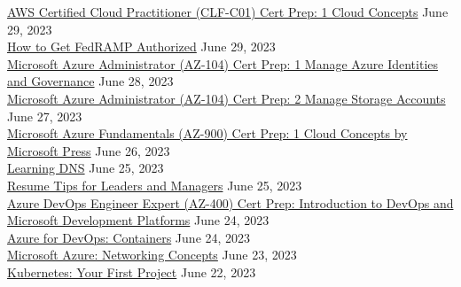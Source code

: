 \documentclass[10pt]{res} %
\begin{document}
\begin{resume}
\href{https://www.linkedin.com/learning/certificates/9de22d87bd7fea7ed83ca23598652f8403624124fe1c69571113fe7b2f4c4d00}{\color{blue}AWS Certified Cloud Practitioner (CLF-C01) Cert Prep: 1 Cloud Concepts} \hfill June 29, 2023 \\
\href{https://www.linkedin.com/learning/certificates/23407ad19a980e0ee2cfcc9a677aefe643d79d1040fd0c91ea4c535d115dbc36}{\color{blue}How to Get FedRAMP Authorized} \hfill June 29, 2023 \\
\href{https://www.linkedin.com/learning/certificates/cd7f1342b355f4b68aa56da7510ac7df921cd744c9c23e4932da31ace1a093da}{\color{blue}Microsoft Azure Administrator (AZ-104) Cert Prep: 1 Manage Azure Identities and Governance} \hfill June 28, 2023 \\
\href{https://www.linkedin.com/learning/certificates/8183480d922bb59b448ae3ed7a3af6c315b52cc7db517c0bd605e39ab8f67f7a}{\color{blue}Microsoft Azure Administrator (AZ-104) Cert Prep: 2 Manage Storage Accounts} \hfill June 27, 2023 \\
\href{https://www.linkedin.com/learning/certificates/57d790951df0f80cef8b6a26d858890d5ce11a88b0abaae86da9d321c7669c6f}{\color{blue}Microsoft Azure Fundamentals (AZ-900) Cert Prep: 1 Cloud Concepts by Microsoft Press} \hfill June 26, 2023 \\
\href{https://www.linkedin.com/learning/certificates/6523a9b1ab9bd557d08da57626ac5253e35817c72d8df04b39fa950fd750b4ce}{\color{blue}Learning DNS} \hfill June 25, 2023 \\
\href{https://www.linkedin.com/learning/certificates/8d61f6d52102674eb045a2ed88f9003f496e0ba1165b5655bf9df09a80bde7f3}{\color{blue}Resume Tips for Leaders and Managers} \hfill June 25, 2023 \\
\href{https://www.linkedin.com/learning/certificates/d02a35adb1e6679d8ee25dbefa79e99f8002100b5f681f0e843d209631f705e2}{\color{blue}Azure DevOps Engineer Expert (AZ-400) Cert Prep: Introduction to DevOps and Microsoft Development Platforms} \hfill June 24, 2023 \\
\href{https://www.linkedin.com/learning/certificates/d2173489e70a304d8a4fbb9b43f6f8ee7779c08a5aa97fc3fd4ad0438728b6a1}{\color{blue}Azure for DevOps: Containers} \hfill June 24, 2023 \\
\href{https://www.linkedin.com/learning/certificates/34aa474b237e84e7853e7fb5d50407ad89d7c51f5576309e25bfd830038bb2e5}{\color{blue}Microsoft Azure: Networking Concepts} \hfill June 23, 2023 \\
\href{https://www.linkedin.com/learning/certificates/84cb1488812eaa270aa6ada753b9638dcbd0f0d68c0a9861a7a36b7eec129013}{\color{blue}Kubernetes: Your First Project} \hfill June 22, 2023 \\

\end{resume}
\end{document}
